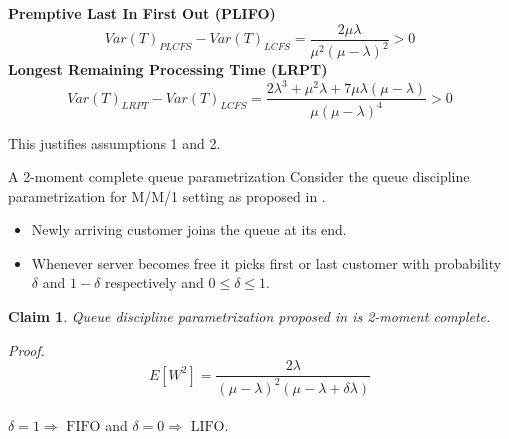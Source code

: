 \documentclass[compress, serif, onlymath, professionalfonts]{beamer}
\newtheorem{claim}[thm]{Claim}
\begin{document}
\begin{frame}
\textbf{Premptive Last In First Out (PLIFO)}
\begin{equation}\nonumber
Var(T)_{PLCFS} -Var(T)_{LCFS} = \dfrac{2\mu\lambda}{\mu^2(\mu-\lambda)^2} >0
\end{equation} 
\textbf{Longest Remaining Processing Time (LRPT)}
\begin{equation}\nonumber
Var(T)_{LRPT} - Var(T)_{LCFS} = \frac{2\lambda^3 + \mu^2\lambda + 7\mu\lambda(\mu-\lambda)}{\mu(\mu-\lambda)^4} >0
\end{equation}
\begin{block}{}
This justifies assumptions 1 and 2.
\end{block}
\end{frame}
\begin{frame}{A 2-moment complete queue parametrization}
Consider the queue discipline parametrization for M/M/1 setting as proposed
in \citet{Q_parameter}.
\begin{itemize}
\item Newly arriving customer joins the queue at its end.
\item Whenever server becomes free it picks first or last customer with probability $\delta$ and $1 -\delta$ respectively and $0 \leq \delta \leq 1$.
\end{itemize}
\begin{claim}
Queue discipline parametrization proposed in \citet{Q_parameter} is 2-moment complete.
\end{claim}
\textit{Proof.} $$E[W^2] = \dfrac{2\lambda}{(\mu-\lambda)^2(\mu-\lambda+\delta\lambda)}$$\\
$\delta =1 \Rightarrow \text{ FIFO} $ and $\delta =0 \Rightarrow \text{ LIFO} $.
\end{frame}
\end{document}
